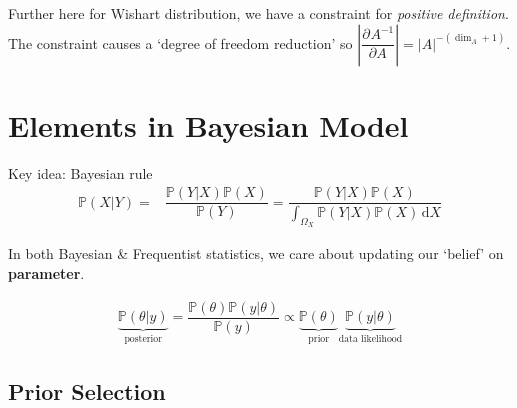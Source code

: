 \begin{itemize}[topsep=2pt,itemsep=0pt]
\begin{itemize}[topsep=2pt,itemsep=0pt]
{        Further here for Wishart distribution, we have a constraint for \textit{positive definition}. The constraint causes a `degree of freedom reduction' so $ \left|\dfrac{\partial^{}A^{-1}}{\partial A^{}}\right| = |A|^{-(\dim_A+1)} $.
        }
    \end{itemize}
        
    
\end{itemize}







    



\section{Elements in Bayesian Model}
Key idea: Bayesian rule
\begin{align*}
    \mathbb{P}\left( X|Y \right)=&\dfrac{\mathbb{P}\left( Y|X \right) \mathbb{P}\left( X  \right) }{\mathbb{P}\left( Y \right) }=\dfrac{\mathbb{P}\left( Y|X  \right) \mathbb{P}\left( X  \right) }{\int _{\Omega_X} \mathbb{P}\left( Y|X  \right) \mathbb{P}\left( X  \right)  \,\mathrm{d}X} 
\end{align*}

In both Bayesian \& Frequentist statistics, we care about updating our `belief' on \textbf{parameter}. 

\begin{align*}
    \underbrace{\mathbb{P}\left( \theta |y  \right)}_{\text{posterior}} =\dfrac{\mathbb{P}\left( \theta  \right) \mathbb{P}\left( y|\theta  \right) }{\mathbb{P}\left( y  \right) }\propto \underbrace{\mathbb{P}\left( \theta  \right) }_{\text{prior}}\underbrace{\mathbb{P}\left( y|\theta  \right)  }_{\text{data likelihood}}
\end{align*}


\subsection{Prior Selection}

